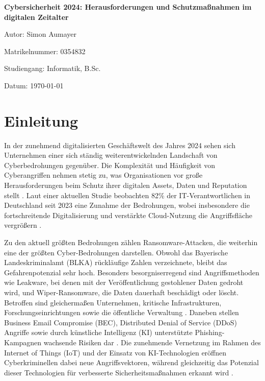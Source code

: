 \documentclass[12pt,a4paper]{article}
\begin{document}
\begin{titlepage}
    \centering
    {\Large\bfseries Cybersicherheit 2024: Herausforderungen und Schutzmaßnahmen im digitalen Zeitalter\par}
    \vspace{2cm}
    {\large Autor: Simon Aumayer\par}
    {\large Matrikelnummer: 0354832\par}
    {\large Studiengang: Informatik, B.Sc.\par}
    \vfill
    {\large Datum: \today\par}
\end{titlepage}

\tableofcontents
\newpage

\section{Einleitung}

In der zunehmend digitalisierten Geschäftswelt des Jahres 2024 sehen sich Unternehmen einer sich ständig weiterentwickelnden Landschaft von Cyberbedrohungen gegenüber. Die Komplexität und Häufigkeit von Cyberangriffen nehmen stetig zu, was Organisationen vor große Herausforderungen beim Schutz ihrer digitalen Assets, Daten und Reputation stellt \parencite{Lallie2021}. Laut einer aktuellen Studie beobachten 82\% der IT-Verantwortlichen in Deutschland seit 2023 eine Zunahme der Bedrohungen, wobei insbesondere die fortschreitende Digitalisierung und verstärkte Cloud-Nutzung die Angriffsfläche vergrößern \parencite{KPMG2023}.

Zu den aktuell größten Bedrohungen zählen Ransomware-Attacken, die weiterhin eine der größten Cyber-Bedrohungen darstellen. Obwohl das Bayerische Landeskriminalamt (BLKA) rückläufige Zahlen verzeichnete, bleibt das Gefahrenpotenzial sehr hoch. Besonders besorgniserregend sind Angriffsmethoden wie Leakware, bei denen mit der Veröffentlichung gestohlener Daten gedroht wird, und Wiper-Ransomware, die Daten dauerhaft beschädigt oder löscht. Betroffen sind gleichermaßen Unternehmen, kritische Infrastrukturen, Forschungseinrichtungen sowie die öffentliche Verwaltung \parencite{CybersicherheitBayern2024}. Daneben stellen Business Email Compromise (BEC), Distributed Denial of Service (DDoS) Angriffe sowie durch künstliche Intelligenz (KI) unterstützte Phishing-Kampagnen wachsende Risiken dar \parencite{Brundage2018}. Die zunehmende Vernetzung im Rahmen des Internet of Things (IoT) und der Einsatz von KI-Technologien eröffnen Cyberkriminellen dabei neue Angriffsvektoren, während gleichzeitig das Potenzial dieser Technologien für verbesserte Sicherheitsmaßnahmen erkannt wird \parencite{Radanliev2020}.
\end{document}
